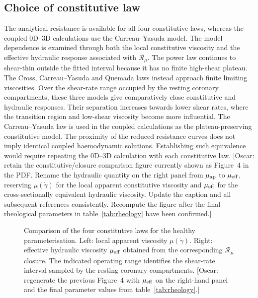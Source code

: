 \documentclass[lineno]{jfm}
\begin{document}
\subsection{Choice of constitutive law}
\label{sec:constitutive-choice}
The analytical resistance is available for all four constitutive laws, whereas
the coupled 0D--3D calculations use the Carreau--Yasuda model. The model
dependence is examined through both the local constitutive viscosity and the
effective hydraulic response associated with $\mathcal{R}_{\mu}$.
The power law continues to shear-thin outside the fitted interval because it
has no finite high-shear plateau. The Cross, Carreau--Yasuda and Quemada laws
instead approach finite limiting viscosities. Over the shear-rate range
occupied by the resting coronary compartments, these three models give
comparatively close constitutive and hydraulic responses. Their separation
increases towards lower shear rates, where the transition region and
low-shear viscosity become more influential. The Carreau--Yasuda law is used
in the coupled calculations as the plateau-preserving constitutive model.
The proximity of the reduced resistance curves does not imply identical
coupled haemodynamic solutions. Establishing such equivalence would require
repeating the 0D--3D calculation with each constitutive law.
{\color{red}[Oscar: retain the constitutive/closure comparison figure currently
shown as Figure~4 in the PDF. Rename the hydraulic quantity on the right panel
from $\mu_{\rm ap}$ to $\mu_{\rm eff}$, reserving
$\mu(\dot\gamma)$ for the local apparent constitutive viscosity and
$\mu_{\rm eff}$ for the cross-sectionally equivalent hydraulic viscosity.
Update the caption and all subsequent references consistently. Recompute the
figure after the final rheological parameters in
table~\ref{tab:rheology} have been confirmed.]}
\begin{figure}
    \centering
    \fbox{
    \rule{0pt}{0.30\textheight}
    \rule{0.92\textwidth}{0pt}
    }
    \caption{Comparison of the four constitutive laws for the healthy
    parameterisation. Left: local apparent viscosity $\mu(\dot\gamma)$.
    Right: effective hydraulic viscosity $\mu_{\rm eff}$ obtained from the
    corresponding $\mathcal{R}_{\mu}$ closure. The indicated operating range
    identifies the shear-rate interval sampled by the resting coronary
    compartments.
    {\color{red}[Oscar: regenerate the previous Figure~4 with
    $\mu_{\rm eff}$ on the right-hand panel and the final parameter values from
    table~\ref{tab:rheology}.]}}
    \label{fig:constitutive-closure-comparison}
\end{figure}
\end{document}
